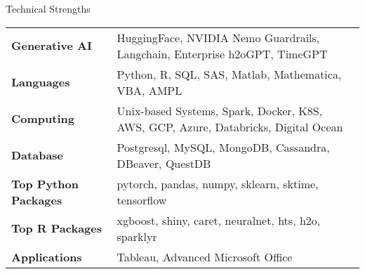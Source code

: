 \documentclass{resume} %
\begin{document}

\begin{rSection}{Technical Strengths}

\begin{tabular}{ @{} >{\bfseries}l @{\hspace{6ex}} l }
Generative AI & HuggingFace, NVIDIA Nemo Guardrails, Langchain, Enterprise h2oGPT, TimeGPT\\
Languages & Python, R, SQL, SAS, Matlab, Mathematica, VBA, AMPL  \\
Computing & Unix-based Systems, Spark, Docker, K8S, AWS, GCP, Azure, Databricks, Digital Ocean\\
Database & Postgresql, MySQL, MongoDB, Cassandra, DBeaver, QuestDB \\
Top Python Packages & pytorch, pandas, numpy, sklearn, sktime, tensorflow    \\
Top R Packages &  xgboost, shiny, caret, neuralnet, hts, h2o, sparklyr  \\
Applications & Tableau, Advanced Microsoft Office \\
\end{tabular}

\end{rSection}

\pagebreak

\end{document}
